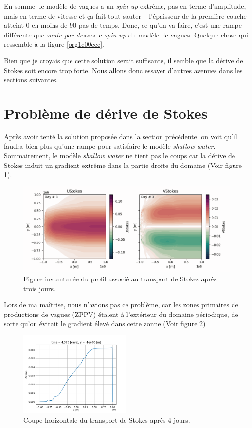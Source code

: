 \documentclass[10pt]{article}
\numberwithin{equation}{section}
\begin{document}
En somme, le modèle de vagues a un \emph{spin up} extrême, pas en terme d'amplitude, mais en terme de vitesse et ça fait tout sauter -- l'épaisseur de la première couche atteint 0 en moins de 90 pas de temps.
Donc, ce qu'on va faire, c'est une rampe différente que \emph{saute par dessus} le \emph{spin up} du modèle de vagues.
Quelque chose qui ressemble à la figure \ref{org1c00ecc}. \bigskip

Bien que je croyais que cette solution serait suffisante, il semble que la dérive de Stokes soit encore trop forte.
Nous allons donc essayer d'autres avenues dans les sections suivantes. 

\section{Problème de dérive de Stokes}
\label{sec:org37e223c}
Après avoir tenté la solution proposée dans la section précédente, on voit qu'il faudra bien plus qu'une rampe pour satisfaire le modèle \emph{shallow water}.
Sommairement, le modèle \emph{shallow water} ne tient pas le coups car la dérive de Stokes induit un gradient extrême dans la partie droite du domaine (Voir figure \ref{fig:org89022a1}).

\begin{figure}[htbp]
\centering
\includegraphics[width=.9\linewidth]{figures/debuggage/2023_10_13_UStokes.png}
\caption{\label{fig:org89022a1}Figure instantanée du profil associé au transport de Stokes après trois jours.}
\end{figure}

Lors de ma maîtrise, nous n'avions pas ce problème, car les zones primaires de productions de vagues (ZPPV) étaient à l'extérieur du domaine périodique, de sorte qu'on évitait le gradient élevé dans cette zonne (Voir figure \ref{fig:org03485a3})

\begin{figure}[!htpb]
\centering
\includegraphics[width=0.5\textwidth]{figures/debuggage/2023_10_13_Stokes_coupe.png}
\caption{\label{fig:org03485a3}Coupe horizontale du transport de Stokes après 4 jours.}
\end{figure}
\end{document}
